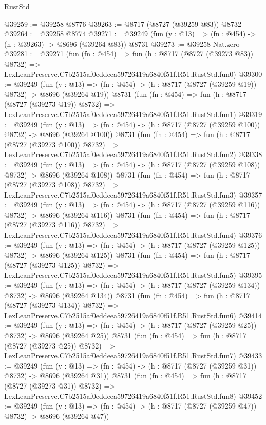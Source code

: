\begin{lexlean}{RustStd}
\begin{coremodule}
@39259 := @39258 @8776
@39263 := @8717 (@8727 (@39259 @83)) @8732
@39264 := @39258 @8774
@39271 := @39249 (fun (y : @13) => (fn : @454) -> (h : @39263) -> @8696 (@39264 @83)) @8731
@39273 := @39258 Nat.zero
@39281 := @39271
    (fun (fn : @454) =>
    fun (h : @8717 (@8727 (@39273 @83)) @8732) =>
    LexLeanPreserve.C7b2515af0eddeea59726419a6840f51f.R51.RustStd.fun0)
@39300 := @39249
    (fun (y : @13) => (fn : @454) -> (h : @8717 (@8727 (@39259 @19)) @8732) -> @8696 (@39264 @19))
    @8731
    (fun (fn : @454) =>
    fun (h : @8717 (@8727 (@39273 @19)) @8732) =>
    LexLeanPreserve.C7b2515af0eddeea59726419a6840f51f.R51.RustStd.fun1)
@39319 := @39249
    (fun (y : @13) => (fn : @454) -> (h : @8717 (@8727 (@39259 @100)) @8732) -> @8696 (@39264 @100))
    @8731
    (fun (fn : @454) =>
    fun (h : @8717 (@8727 (@39273 @100)) @8732) =>
    LexLeanPreserve.C7b2515af0eddeea59726419a6840f51f.R51.RustStd.fun2)
@39338 := @39249
    (fun (y : @13) => (fn : @454) -> (h : @8717 (@8727 (@39259 @108)) @8732) -> @8696 (@39264 @108))
    @8731
    (fun (fn : @454) =>
    fun (h : @8717 (@8727 (@39273 @108)) @8732) =>
    LexLeanPreserve.C7b2515af0eddeea59726419a6840f51f.R51.RustStd.fun3)
@39357 := @39249
    (fun (y : @13) => (fn : @454) -> (h : @8717 (@8727 (@39259 @116)) @8732) -> @8696 (@39264 @116))
    @8731
    (fun (fn : @454) =>
    fun (h : @8717 (@8727 (@39273 @116)) @8732) =>
    LexLeanPreserve.C7b2515af0eddeea59726419a6840f51f.R51.RustStd.fun4)
@39376 := @39249
    (fun (y : @13) => (fn : @454) -> (h : @8717 (@8727 (@39259 @125)) @8732) -> @8696 (@39264 @125))
    @8731
    (fun (fn : @454) =>
    fun (h : @8717 (@8727 (@39273 @125)) @8732) =>
    LexLeanPreserve.C7b2515af0eddeea59726419a6840f51f.R51.RustStd.fun5)
@39395 := @39249
    (fun (y : @13) => (fn : @454) -> (h : @8717 (@8727 (@39259 @134)) @8732) -> @8696 (@39264 @134))
    @8731
    (fun (fn : @454) =>
    fun (h : @8717 (@8727 (@39273 @134)) @8732) =>
    LexLeanPreserve.C7b2515af0eddeea59726419a6840f51f.R51.RustStd.fun6)
@39414 := @39249
    (fun (y : @13) => (fn : @454) -> (h : @8717 (@8727 (@39259 @25)) @8732) -> @8696 (@39264 @25))
    @8731
    (fun (fn : @454) =>
    fun (h : @8717 (@8727 (@39273 @25)) @8732) =>
    LexLeanPreserve.C7b2515af0eddeea59726419a6840f51f.R51.RustStd.fun7)
@39433 := @39249
    (fun (y : @13) => (fn : @454) -> (h : @8717 (@8727 (@39259 @31)) @8732) -> @8696 (@39264 @31))
    @8731
    (fun (fn : @454) =>
    fun (h : @8717 (@8727 (@39273 @31)) @8732) =>
    LexLeanPreserve.C7b2515af0eddeea59726419a6840f51f.R51.RustStd.fun8)
@39452 := @39249
    (fun (y : @13) => (fn : @454) -> (h : @8717 (@8727 (@39259 @47)) @8732) -> @8696 (@39264 @47))

\end{coremodule}
\end{lexlean}
